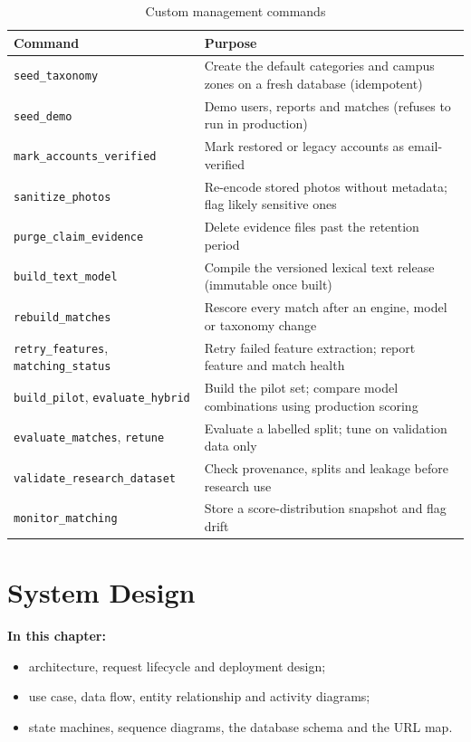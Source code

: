 \documentclass[12pt,a4paper,oneside]{report}
\newcommand{\code}[1]{\texttt{#1}}
\begin{document}
\begin{table}[H]
\centering\small
\caption{Custom management commands}
\begin{tabularx}{\textwidth}{P{53mm}X}
\toprule
Command & Purpose\\
\midrule
\code{seed\_taxonomy} & Create the default categories and campus zones on a fresh database (idempotent)\\
\code{seed\_demo} & Demo users, reports and matches (refuses to run in production)\\
\code{mark\_accounts\_verified} & Mark restored or legacy accounts as email-verified\\
\code{sanitize\_photos} & Re-encode stored photos without metadata; flag likely sensitive ones\\
\code{purge\_claim\_evidence} & Delete evidence files past the retention period\\
\code{build\_text\_model} & Compile the versioned lexical text release (immutable once built)\\
\code{rebuild\_matches} & Rescore every match after an engine, model or taxonomy change\\
\code{retry\_features}, \code{matching\_status} & Retry failed feature extraction; report feature and match health\\
\code{build\_pilot}, \code{evaluate\_hybrid} & Build the pilot set; compare model combinations using production scoring\\
\code{evaluate\_matches}, \code{retune} & Evaluate a labelled split; tune on validation data only\\
\code{validate\_research\_dataset} & Check provenance, splits and leakage before research use\\
\code{monitor\_matching} & Store a score-distribution snapshot and flag drift\\
\bottomrule
\end{tabularx}
\end{table}

\chapter{System Design}
\textbf{In this chapter:}
\begin{itemize}[beginpenalty=10000]
  \item architecture, request lifecycle and deployment design;
  \item use case, data flow, entity relationship and activity diagrams;
  \item state machines, sequence diagrams, the database schema and the URL map.
\end{itemize}
\end{document}
